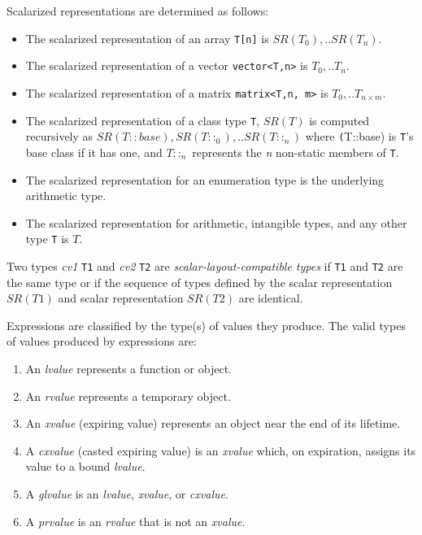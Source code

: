 \p Scalarized representations are determined as follows:
\begin{itemize}
\item The scalarized representation of an array \texttt{T[n]} is \(SR(T_0), ..
SR(T_n)\).

\item The scalarized representation of a vector \texttt{vector<T,n>} is \(T_0,
.. T_n\).

\item The scalarized representation of a matrix \texttt{matrix<T,n, m>} is
\(T_0, .. T_{n \times m}\).

\item The scalarized representation of a class type \texttt{T}, \(SR(T)\) is
computed recursively as \(SR(T::base), SR(T::_0), .. SR(T::_n)\) where
\texttt(T::base) is \texttt{T}'s base class if it has one, and \(T::_n\)
represents the \textit{n} non-static members of \texttt{T}.

\item The scalarized representation for an enumeration type is the underlying
arithmetic type.

\item The scalarized representation for arithmetic, intangible types, and any other
type \texttt{T} is \(T\).
\end{itemize}

\p Two types \textit{cv1} \texttt{T1} and \textit{cv2} \texttt{T2} are
\textit{scalar-layout-compatible types} if \texttt{T1} and \texttt{T2} are the same
type or if the sequence of types defined by the scalar representation \(SR(T1)\)
and scalar representation \(SR(T2)\) are identical.


\p Expressions are classified by the type(s) of values they produce. The valid
types of values produced by expressions are:

\begin{enumerate}
  \item An \textit{lvalue} represents a function or object.
  \item An \textit{rvalue} represents a temporary object.
  \item An \textit{xvalue} (expiring value) represents an object near the end
  of its lifetime.
  \item A \textit{cxvalue} (casted expiring value) is an \textit{xvalue}
  which, on expiration, assigns its value to a bound \textit{lvalue}.
  \item A \textit{glvalue} is an \textit{lvalue}, \textit{xvalue}, or
  \textit{cxvalue}.
  \item A \textit{prvalue} is an \textit{rvalue} that is not an \textit{xvalue}.
\end{enumerate}


